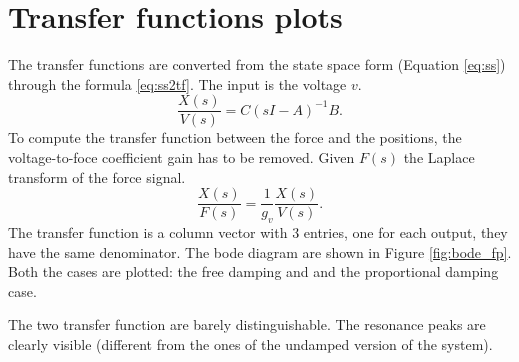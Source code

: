 \documentclass[twosided,a4paper]{article}           %
\begin{document}
\section{Transfer functions plots}
The transfer functions are converted from the state space form (Equation \eqref{eq:ss}) through the formula \eqref{eq:ss2tf}. The input is the voltage $v$.
\begin{equation}
\label{eq:ss2tf}
	\dfrac{X(s)}{V(s)} = C(sI-A)^{-1}B.
\end{equation}
To compute the transfer function between the force and the positions, the voltage-to-foce coefficient gain has to be removed. Given $F(s)$ the Laplace transform of the force signal.
\begin{equation}
	\dfrac{X(s)}{F(s)} = \dfrac{1}{g_v}\dfrac{X(s)}{V(s)}.
\end{equation}
The transfer function is a column vector with 3 entries, one for each output, they have the same denominator. The bode diagram are shown in Figure \ref{fig:bode_fp}. Both the cases are plotted: the free damping and and the proportional damping case. \\
\par \noindent
The two transfer function are barely distinguishable. The resonance peaks are clearly visible (different from the ones of the undamped version of the system).
\end{document}
